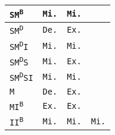 \begin{tabular}{|l||c|c|c|}
 \texttt{SM\textsuperscript{B}}


 & \cellcolor{olive!80}\texttt{Mi.}
 & \cellcolor{olive!80}\texttt{Mi.}
 & \cellcolor{black!40}
 \\
 \hline

 \texttt{SM\textsuperscript{D}}

 & \cellcolor{blue!40}\texttt{De.}
 & \cellcolor{orange!60}\texttt{Ex.}
 & \cellcolor{black!40}
 \\
 \hline

 \texttt{SM\textsuperscript{D}I}

 & \cellcolor{olive!80}\texttt{Mi.}
 & \cellcolor{olive!80}\texttt{Mi.}
 & \cellcolor{black!40}
 \\
 \hline

 \texttt{SM\textsuperscript{D}S}

 & \cellcolor{olive!80}\texttt{Mi.}
 & \cellcolor{orange!60}\texttt{Ex.}
 & \cellcolor{black!40}
 \\
 \hline

 \texttt{SM\textsuperscript{D}SI}

 & \cellcolor{olive!80}\texttt{Mi.}
 & \cellcolor{olive!80}\texttt{Mi.}
 & \cellcolor{black!40}
 \\
 \hline

 \texttt{M}

 & \cellcolor{blue!40}\texttt{De.}
 & \cellcolor{orange!60}\texttt{Ex.}
 & \cellcolor{black!40}
 \\
 \hline

 \texttt{MI\textsuperscript{B}}

 & \cellcolor{orange!60}\texttt{Ex.}
 & \cellcolor{orange!60}\texttt{Ex.}
 & \cellcolor{black!40}
 \\
 \hline

 \texttt{II\textsuperscript{B}}

 & \cellcolor{olive!80}\texttt{Mi.}
 & \cellcolor{olive!80}\texttt{Mi.}
 & \cellcolor{olive!80}\texttt{Mi.}
 \\
 \hline


\end{tabular}
